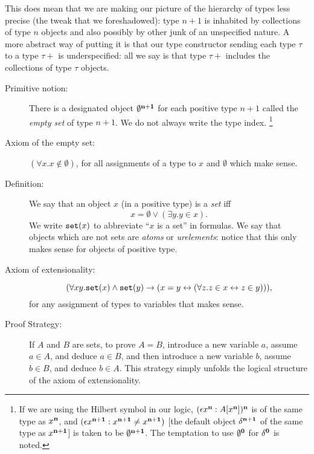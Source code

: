 \documentclass[12pt]{book}
\begin{document}
This does mean that we are making our picture of the hierarchy of
types less precise (the tweak that we foreshadowed): type $n+1$ is inhabited by collections of type $n$
objects and also possibly by other junk of an unspecified nature.  A more abstract way of putting it is that our type constructor sending each type $\tau$ to a type $\tau+$ is underspecified:  all we say is that type $\tau+$ includes the collections of type $\tau$ objects.

\begin{description}

\item[Primitive notion:] There is a designated object $\emptyset^{\bf
n+1}$ for each positive type $n+1$ called the {\em empty set\/} of
type $n+1$.  We do not always write the type index.  \footnote{ If we are using the Hilbert symbol in our logic, $(\epsilon x^{\bf n}:A[x^{\bf n}])^{\bf n}$ is of the same type as $x^{\bf n}$, and $(\epsilon x^{\bf n+1}:x^{\bf n+1} \neq x^{\bf n+1})$ [the default object $\delta^{\bf n+1}$ of the same type as $x^{\bf n+1}$] is taken to be $\emptyset^{\bf n+1}$.  The temptation to use $\emptyset^{\bf 0}$ for $\delta^{\bf 0}$ is noted.}

\item[Axiom of the empty set:] $(\forall x.x\not\in \emptyset)$, for
all assignments of a type to $x$ and $\emptyset$ which make sense.

\item[Definition:] We say that an object $x$ (in a positive type) is a
{\em set\/} iff $$x = \emptyset \vee (\exists y.y \in x).$$  We write
${\tt set}(x)$ to abbreviate ``$x$ is a set'' in formulas.  We say
that objects which are not sets are {\em atoms} or {\em urelements\/}:  notice that this only makes sense for objects of positive type.

\item[Axiom of extensionality:] $$(\forall xy.{\tt set}(x) \wedge {\tt
set}(y) \rightarrow (x=y\leftrightarrow (\forall z.z\in x
\leftrightarrow z\in y))),$$ for any assignment of types to variables that makes sense.

\item[Proof Strategy:] If $A$ and $B$ are sets, to prove $A=B$,
introduce a new variable $a$, assume $a \in A$, and deduce $a \in B$,
and then introduce a new variable $b$, assume $b \in B$, and deduce $b
\in A$.  This strategy simply unfolds the logical structure of the
axiom of extensionality.

\end{description}
\end{document}
